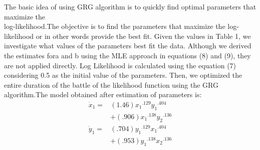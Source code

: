 \documentclass[]{article}
\begin{document}
The basic idea of using GRG algorithm is to quickly find optimal parameters that maximize the \\log-likelihood.The objective is to find the parameters that maximize the log-likelihood or in other words provide the best fit. Given the values in Table 1, we investigate what values of the parameters best fit the data. Although we derived the estimates fora and b using the MLE approach in equations (8) and (9), they are not applied directly. Log Likelihood is calculated using the equation (7) considering 0.5 as the initial value of the parameters. Then, we optimized the entire duration of the battle of the likelihood function using the GRG algorithm.The model obtained after estimation of parameters is:
\begin{equation}
\begin{split}
    \Dot{x}_1=&(1.46){x_1}^{.129}{y_1}^{.404} \\
     &+(.906){x_1}^{.138}{y_2}^{.136} \\
     \Dot{y}_1=&(.704){y_1}^{.129}{x_1}^{.404}\\
      &+(.953){y_1}^{.138}{x_2}^{.136}\\
\end{split}
\end{equation}
	
\end{document}
